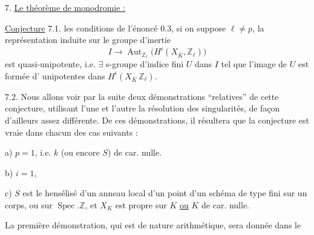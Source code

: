 
7. \uline{Le théorème de monodromie :}  


\uline{Conjecture} 7.1.  
les conditions de l'énoncé 0.3, si on suppose $\ell\ne p$, la représentation induite sur le groupe d'inertie
\[
 I\longrightarrow \operatorname{Aut}_{\mathbb Z_\ell}\bigl(H^i(X_{\overline K},\mathbb Z_\ell)\bigr)
\]
est quasi-unipotente, i.e. $\exists$ s-groupe d'indice fini $U$ dans $I$ tel que l'image de $U$ est formée d' unipotentes dans $H^i(X_{\overline K}\,\mathbb Z_\ell)$.

7.2. Nous allons voir par la suite deux démonstrations ``relatives'' de cette conjecture, utilisant l'une et l'autre la résolution des singularités,  de façon d'ailleurs assez différente. De ces démonstrations, il résultera que la conjecture est vraie dans chacun des cas suivants :

a) $p=1$, i.e. $k$ (ou encore $S$) de car. nulle.

b) $i=1$,

c) $S$ est le hensélisé  d'un anneau local d'un point d'un schéma de type fini sur un corps, ou sur $\operatorname{Spec}.\mathbb Z$, et $X_K$ est propre sur $K$ \uline{ou} $K$ de car. nulle.

La première démonstration, qui est de nature arithmétique, sera donnée dans le
